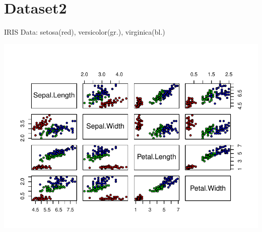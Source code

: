 \documentclass[aspectratio=1610, t]{beamer}\usepackage[]{graphicx}\usepackage[]{color}
\makeatletter
\def\maxwidth{ %
  \ifdim\Gin@nat@width>\linewidth
    \linewidth
  \else
    \Gin@nat@width
  \fi
}
\newenvironment{knitrout}{}{} %
\makeatother
\begin{document}
\section{Dataset2}
\begin{frame}{IRIS Data: \small setosa(red), versicolor(gr.), virginica(bl.)}
\vspace{-1.9cm}
\begin{knitrout}
\color{fgcolor}

{\centering \includegraphics[width=\maxwidth]{figure/scatterplot-1} 

}


\end{knitrout}
\end{frame}
\end{document}
